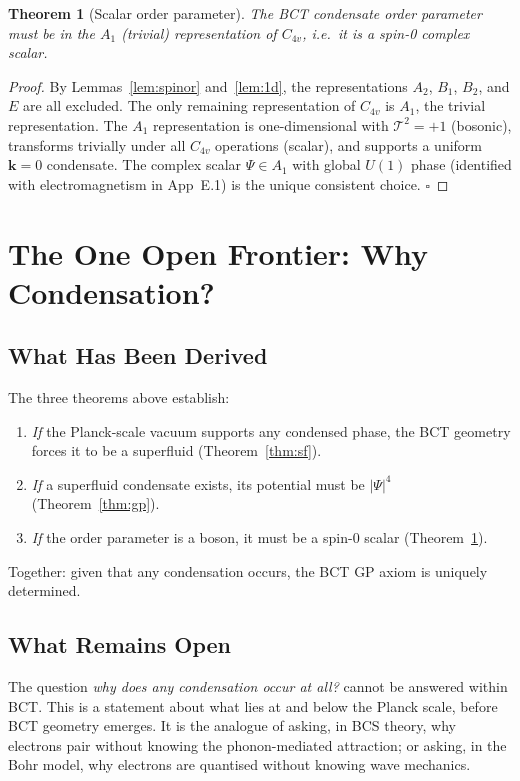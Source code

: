 \documentclass[11pt,a4paper]{article}
\theoremstyle{bctthm}
\newtheorem{theorem}{Theorem}
\theoremstyle{definition}
\begin{document}
\begin{theorem}[Scalar order parameter]\label{thm:scalar}
The BCT condensate order parameter must be in the $A_1$ (trivial)
representation of $C_{4v}$, i.e.\ it is a spin-0 complex scalar.
\end{theorem}
\begin{proof}
By Lemmas~\ref{lem:spinor} and~\ref{lem:1d}, the representations
$A_2$, $B_1$, $B_2$, and $E$ are all excluded. The only remaining
representation of $C_{4v}$ is $A_1$, the trivial representation.
The $A_1$ representation is one-dimensional with $\mathcal{T}^2 = +1$
(bosonic), transforms trivially under all $C_{4v}$ operations
(scalar), and supports a uniform $\mathbf{k}=0$ condensate.
The complex scalar $\Psi \in A_1$ with global $U(1)$ phase
(identified with electromagnetism in App~E.1) is the unique
consistent choice. $\square$
\end{proof}

\section{The One Open Frontier: Why Condensation?}

\subsection{What Has Been Derived}

The three theorems above establish:
\begin{enumerate}
\item \emph{If} the Planck-scale vacuum supports any condensed phase,
the BCT geometry forces it to be a superfluid (Theorem~\ref{thm:sf}).
\item \emph{If} a superfluid condensate exists, its potential must
be $|\Psi|^4$ (Theorem~\ref{thm:gp}).
\item \emph{If} the order parameter is a boson, it must be a
spin-0 scalar (Theorem~\ref{thm:scalar}).
\end{enumerate}
Together: given that any condensation occurs, the BCT GP axiom
is uniquely determined.

\subsection{What Remains Open}

The question \emph{why does any condensation occur at all?}
cannot be answered within BCT. This is a statement about what
lies at and below the Planck scale, before BCT geometry emerges.
It is the analogue of asking, in BCS theory, why electrons pair
without knowing the phonon-mediated attraction; or asking,
in the Bohr model, why electrons are quantised without knowing
wave mechanics.
\end{document}
